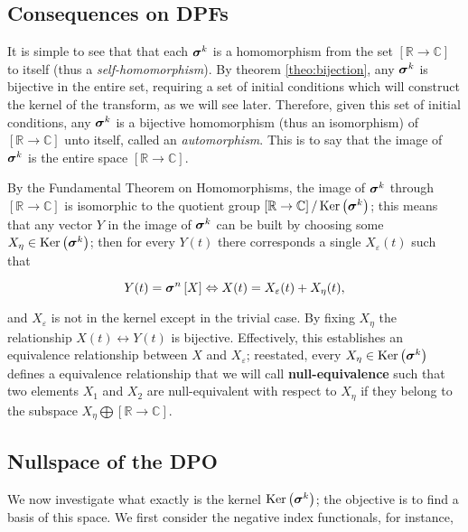 \subsection{Consequences on DPFs} %

	It is simple to see that that each $\boldsymbol{\sigma}^{k}$ is a homomorphism from the set $\left[\mathbb{R}\to\mathbb{C}\right]$ to itself (thus a \textit{self-homomorphism}). By theorem \ref{theo:bijection}, any $\boldsymbol{\sigma}^{k}$ is bijective in the entire set, requiring a set of initial conditions which will construct the kernel of the transform, as we will see later. Therefore, given this set of initial conditions, any $\boldsymbol{\sigma}^{k}$ is a bijective homomorphism (thus an isomorphism) of $\left[\mathbb{R}\to\mathbb{C}\right]$ unto itself, called an \textit{automorphism}. This is to say that the image of $\boldsymbol{\sigma}^{k}$ is the entire space $\left[\mathbb{R}\to\mathbb{C}\right]$.

	 By the Fundamental Theorem on Homomorphisms, the image of $\boldsymbol{\sigma}^{k}$ through $\left[\mathbb{R}\to\mathbb{C}\right]$ is isomorphic to the quotient group $\left[\mathbb{R}\to\mathbb{C}\right]/\operatorname{Ker}\left(\boldsymbol{\sigma}^{k}\right)$; this means that any vector $Y$ in the image of $\boldsymbol{\sigma}^{k}$ can be built by choosing some $X_\eta\in\operatorname{Ker}\left(\boldsymbol{\sigma}^{k}\right)$; then for every $Y(t)$ there corresponds a single $X_\varepsilon(t)$ such that

\begin{equation} Y(t) = \boldsymbol{\sigma}^{n}\left[X\right] \Leftrightarrow X(t) = X_\varepsilon(t) + X_\eta(t) ,\end{equation}

	\noindent and $X_\varepsilon$ is not in the kernel except in the trivial case. By fixing $X_\eta$ the relationship $X(t)\leftrightarrow Y(t)$ is bijective. Effectively, this establishes an equivalence relationship between $X$ and $X_\varepsilon$; reestated, every $X_\eta\in\operatorname{Ker}\left(\boldsymbol{\sigma}^{k}\right)$ defines a equivalence relationship that we will call \textbf{null-equivalence} such that two elements $X_1$ and $X_2$ are null-equivalent with respect to $X_\eta$ if they belong to the subspace $X_\eta \bigoplus \left[\mathbb{R}\to\mathbb{C}\right]$.

\subsection{Nullspace of the DPO} %

	We now investigate what exactly is the kernel $\operatorname{Ker}\left(\boldsymbol{\sigma}^{k}\right)$; the objective is to find a basis of this space. We first consider the negative index functionals, for instance,

